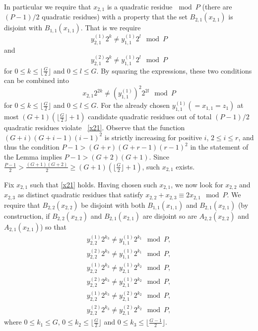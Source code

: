 \documentclass[12pt]{article} \pagestyle{plain} \topmargin
\begin{document}
In particular we require that $x_{2,1}$ is a quadratic
residue$~\mod P$ (there are $(P-1)/2$ quadratic residues) with a
property that the set $B_{2,1}(x_{2,1})$ is disjoint with
$B_{1,1}(x_{1,1})$. That is we require \[y_{2,1}^{(1)}2^k \neq
y_{1,1}^{(1)} 2^l \mod P \] and
\[y_{2,1}^{(2)}2^k \neq y_{1,1}^{(1)} 2^l \mod P \] for $0 \leq k \leq \lfloor
\frac{G}{2} \rfloor$ and $0 \leq l \leq G$. By squaring the
expressions, these two conditions can be combined into
\begin{equation}\label{x21}x_{2,1}2^{2k} \neq (y_{1,1}^{(1)})^2 2^{2l} \mod P \end{equation}for $0
\leq k \leq \lfloor \frac{G}{2} \rfloor$ and $0 \leq l \leq G$. For
the already chosen $y_{1,1}^{(1)}(=x_{1,1}=z_1)$ at most
$(G+1)(\lfloor \frac{G}{2} \rfloor+1)$ candidate quadratic residues
out of total $(P-1)/2$ quadratic residues violate ~\eqref{x21}.
Observe that the function $(G+i)(G+i-1)(i-1)^2$ is strictly
increasing for positive $i$, $2 \leq i \leq r$, and thus the
condition $P-1> (G+r)(G+r-1)(r-1)^2$ in the statement of the Lemma
implies $P-1>(G+2)(G+1)$. Since $\frac{P-1}{2} >
\frac{(G+1)(G+2)}{2} \geq (G+1)(\lfloor \frac{G}{2} \rfloor+1)$,
such $x_{2,1}$ exists.

Fix $x_{2,1}$ such that \eqref{x21} holds. Having chosen such
$x_{2,1}$, we now look for $x_{2,2}$ and $x_{2,3}$ as distinct
quadratic residues that satisfy $x_{2,2}+x_{2,3} \equiv 2x_{2,1}
\mod P$. We require that $B_{2,2}(x_{2,2})$ be disjoint with both
$B_{1,1}(x_{1,1})$ and $B_{2,1}(x_{2,1})$ (by construction, if
$B_{2,2}(x_{2,2})$ and $B_{2,1}(x_{2,1})$ are disjoint so are
$A_{2,2}(x_{2,2})$ and $A_{2,1}(x_{2,1})$) so that
\begin{equation}\label{eqx22pre}\begin{array}{ccc}
y_{2,2}^{(1)}2^{k_3} \neq y_{1,1}^{(1)} 2^{k_1} \mod P, \\
y_{2,2}^{(2)}2^{k_3} \neq y_{1,1}^{(1)} 2^{k_1} \mod P,  \\
y_{2,2}^{(1)}2^{k_3} \neq y_{2,1}^{(1)} 2^{k_2} \mod P, \\
y_{2,2}^{(2)}2^{k_3} \neq y_{2,1}^{(1)} 2^{k_2} \mod P,  \\
y_{2,2}^{(1)}2^{k_3} \neq y_{2,1}^{(2)} 2^{k_2} \mod P, \\
y_{2,2}^{(2)}2^{k_3} \neq y_{2,1}^{(2)} 2^{k_2} \mod P,
\end{array}\end{equation}
where $0 \leq k_1 \leq G$, $0 \leq k_2 \leq \lfloor \frac{G}{2}
\rfloor$ and $0 \leq k_3 \leq \lfloor\frac{G-1}{2} \rfloor$.
\end{document}
